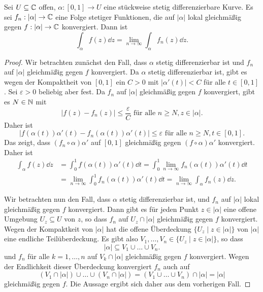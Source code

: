 \documentclass[a4paper,10pt]{article}
\begin{document}
\begin{lem}
 Sei $U \subseteq \mathbb{C}$ offen, $\alpha : [0,1] \to U$ eine stückweise stetig differenzierbare Kurve. Es sei $f_n : |\alpha| \to \mathbb{C}$ eine Folge stetiger Funktionen, die auf $|\alpha|$ lokal gleichmäßig gegen $f : |\alpha| \to \mathbb{C}$ konvergiert. Dann ist
 \[
  \int_\alpha f(z) \dd{z} = \lim_{n \to \infty} \int_\alpha f_n(z) \dd{z}.
 \]
\end{lem}\label{lem: Wegintegral und Grenzwert vertauschen}
\begin{proof}
 Wir betrachten zunächst den Fall, dass $\alpha$ stetig differenzierbar ist und $f_n$ auf $|\alpha|$ gleichmäßig gegen $f$ konvergiert. Da $\alpha$ stetig differenzierbar ist, gibt es wegen der Kompaktheit von $[0,1]$ ein $C > 0$ mit $|\alpha'(t)| < C$ für alle $t \in [0,1]$. Sei $\varepsilon > 0$ beliebig aber fest. Da $f_n$ auf $|\alpha|$ gleichmäßig gegen $f$ konvergiert, gibt es $N \in \mathbb{N}$ mit
 \[
  |f(z)-f_n(z)| \leq \frac{\varepsilon}{C} \text{ für alle } n \geq N, z \in |\alpha|.
 \]
 Daher ist
 \[
  |f(\alpha(t))\alpha'(t) - f_n(\alpha(t))\alpha'(t)| \leq \varepsilon \text{ für alle } n \geq N, t \in [0,1].
 \]
 Das zeigt, dass $(f_n \circ \alpha) \alpha'$ auf $[0,1]$ gleichmäßig gegen $(f \circ \alpha) \alpha'$ konvergiert. Daher ist
 \begin{align*}
  \int_\alpha f(z) \dd{z}
  &= \int_0^1 f(\alpha(t)) \alpha'(t) \dd{t}
  = \int_0^1 \lim_{n \to \infty} f_n(\alpha(t)) \alpha'(t) \dd{t} \\
  &= \lim_{n \to \infty} \int_0^1 f_n(\alpha(t)) \alpha'(t) \dd{t}
  = \lim_{n \to \infty} \int_\alpha f_n(z) \dd{z}.
 \end{align*}

Wir betrachten nun den Fall, dass $\alpha$ stetig differenzierbar ist, und $f_n$ auf $|\alpha|$ lokal gleichmäßig gegen $f$ konvergiert. Dann gibt es für jeden Punkt $z \in |\alpha|$ eine offene Umgebung $U_z \subseteq U$ von $z$, so dass $f_n$ auf $U_z \cap |\alpha|$ gleichmäßig gegen $f$ konvergiert. Wegen der Kompaktkeit von $|\alpha|$ hat die offene Überdeckung $\{U_z \mid z \in |\alpha|\}$ von $|\alpha|$ eine endliche Teilüberdeckung. Es gibt also $V_1, \ldots, V_n \in \{U_z \mid z \in |\alpha|\}$, so dass
\[
 |\alpha| \subseteq V_1 \cup \ldots \cup V_n.
\]
und $f_n$ für alle $k = 1, \ldots, n$ auf $V_k \cap |\alpha|$ gleichmäßig gegen $f$ konvergiert. Wegen der Endlichkeit dieser Überdeckung konvergiert $f_n$ auch auf
\[
 (V_1 \cap |\alpha|) \cup \ldots \cup (V_n \cap |\alpha|)
 = (V_1 \cup \ldots \cup V_n) \cap |\alpha|
 = |\alpha|
\]
gleichmäßig gegen $f$. Die Aussage ergibt sich daher aus dem vorherigen Fall.


\end{proof}
\end{document}
